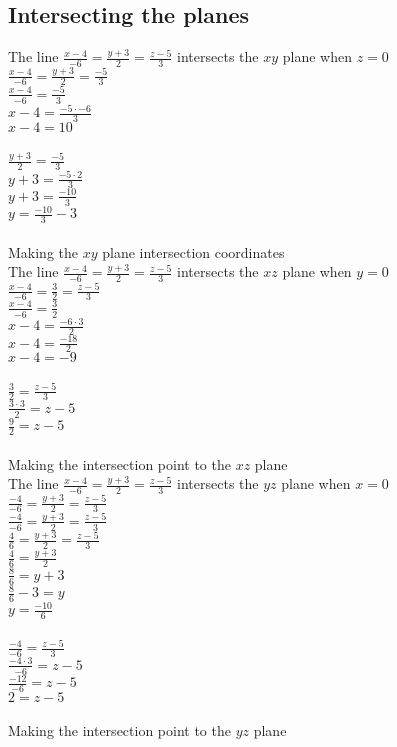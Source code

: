 \documentclass{article}
\begin{document}
\subsection{Intersecting the planes}
The line $\frac{x-4}{-6}=\frac{y+3}{2}=\frac{z-5}{3}$ intersects the $xy$ plane when $z=0$
\\[0.1in]$\frac{x-4}{-6}=\frac{y+3}{2}=\frac{-5}{3}$
\\[0.1in]$\frac{x-4}{-6}=\frac{-5}{3}$
\\[0.1in]${x-4}=\frac{-5\cdot -6}{3}$
\\[0.1in]${x-4}=10$
\\[0.1in]
\\[0.1in]$\frac{y+3}{2}=\frac{-5}{3}$
\\[0.1in]${y+3}=\frac{-5\cdot 2}{3}$
\\[0.1in]${y+3}=\frac{-10}{3}$
\\[0.1in]${y}=\frac{-10}{3}-3$
\\[0.1in]
\\Making the $xy$ plane intersection coordinates 
\\The line $\frac{x-4}{-6}=\frac{y+3}{2}=\frac{z-5}{3}$ intersects the $xz$ plane when $y=0$
\\[0.1in]$\frac{x-4}{-6}=\frac{3}{2}=\frac{z-5}{3}$ 
\\[0.1in]$\frac{x-4}{-6}=\frac{3}{2}$ 
\\[0.1in]${x-4}=\frac{-6\cdot3}{2}$ 
\\[0.1in]${x-4}=\frac{-18}{2}$ 
\\[0.1in]${x-4}={-9}$ 
\\[0.1in]
\\[0.1in]$\frac{3}{2}=\frac{z-5}{3}$ 
\\[0.1in]$\frac{3\cdot 3}{2}={z-5}$ 
\\[0.1in]$\frac{9}{2}={z-5}$ 
\\[0.1in]
\\[0.1in]Making the intersection point to the $xz$ plane 
\\The line $\frac{x-4}{-6}=\frac{y+3}{2}=\frac{z-5}{3}$ intersects the $yz$ plane when $x=0$
\\[0.1in]$\frac{-4}{-6}=\frac{y+3}{2}=\frac{z-5}{3}$
\\[0.1in]$\frac{-4}{-6}=\frac{y+3}{2}=\frac{z-5}{3}$
\\[0.1in]$\frac{4}{6}=\frac{y+3}{2}=\frac{z-5}{3}$
\\[0.1in]$\frac{4}{6}=\frac{y+3}{2}$
\\[0.1in]$\frac{8}{6}={y+3}$
\\[0.1in]$\frac{8}{6}-3={y}$
\\[0.1in]$y=\frac{-10}{6}$
\\[0.1in]
\\[0.1in]$\frac{-4}{-6}=\frac{z-5}{3}$
\\[0.1in]$\frac{-4\cdot 3}{-6}={z-5}$
\\[0.1in]$\frac{-12}{-6}={z-5}$
\\[0.1in]$2={z-5}$
\\[0.1in]
\\[0.1in]Making the intersection point to the $yz$ plane 
\end{document}
